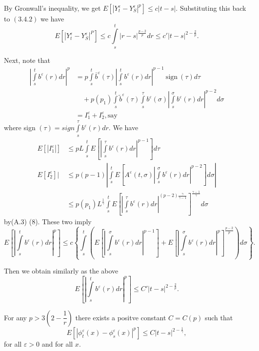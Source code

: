  By Gronwall's inequality, we get $E[| Y^\varepsilon_t-
   Y^\varepsilon_S |^p] \le c|t-s|$. Substituting this back to
 $(3.4.2)$ we have  
 \begin{equation*}
   E[| Y^\varepsilon_t - Y^\varepsilon_S |^P]  \le c \int\limits_{s}^t
   |r-s|^{\frac{p-2}{p}} dr 
   \le c'|t-s|^{2-\frac{2}{p}}. \tag{3.4.3}\label{c3:eq3.4.3} 
  \end{equation*}
   
Next, note that  
\begin{align*}
  |\int\limits_{s}^t b^\varepsilon (r) dr |^p &= p
  \int\limits_{s}^t \bar{b}^\varepsilon(\tau)| \int\limits_{s}^t
  b^\varepsilon (r) dr|^{p-1} ~\text{sign}~ (\tau) d \tau\\
  & \quad + p(p_1)
  \int\limits_{s}^t \tilde{b}^\varepsilon (\tau ) \int\limits_{s}^\tau
  b^\varepsilon (\sigma) | \int\limits_{s}^\sigma b^\varepsilon (r) dr
  |^{p-2} d \sigma\\ 
  &=I^\varepsilon_1 + I^\varepsilon_2,  \text{say}
\end{align*} 
 where sign $(\tau)= sign \int\limits_{s}^\tau b^\varepsilon (r) dr$. We have
 \begin{align*}
   E[|I^\varepsilon_1 |] &\le pL \int\limits_{s}^t E\left[|
     \int\limits_{s}^\tau b^\varepsilon (r) dr |^{p-1}\right] d \tau
   \tag*{(by(A.3)(7))}\\ 
   E[I^\varepsilon_2 ]| &\le p(p-1)| \int\limits_{s}^t
   E\left[A^\varepsilon(t, \sigma) |\int\limits_{s}^\sigma b^\varepsilon
     (r) dr |^{p-2}\right] d \sigma |\\ 
   &\le p(p_1)L^{\frac{1}{\gamma}} \int\limits_{s}^t E\left[|
     \int\limits_{s}^\tau b^\varepsilon (r) dr| ^{(p-2)
       \frac{\gamma}{\gamma-1}}\right]^{\frac{\gamma-1}{\gamma}} d \sigma 
 \end{align*} 
 by\pageoriginale (A.3) (8). These two imply
{\fontsize{10}{12}\selectfont 
$$
 E\left[| \int\limits_{s}^t b^\varepsilon (r) dr|^p\right] \le c
 \left\{\int\limits_{s}^t \left(E\left[| \int\limits_{s}^\sigma b^\varepsilon (r)
   dr|^{p-1}\right] +E \left[| \int\limits_{s}^\sigma b^\varepsilon  (r)
   dr|^p\right]^{\frac{p-2}{p}}\right) d \sigma \right\}. 
 $$}\relax
  
 Then we obtain similarly as the above
 $$
 E\left[| \int\limits_{s}^t b^\varepsilon (r)  dr |^p \right] \le
 C'|t-s|^{2- \frac{2}{p}}. 
 $$

\setcounter{Lemma}{1}
\begin{Lemma}\label{c3:lem3.4.2}%
  For any $p > 3(2- \dfrac{1}{r})$ there exists a positve constant
  $C=C(p)$ such that 
  \begin{equation*} 
    E[| \phi^\varepsilon_t (x) - \phi^\varepsilon_s(x) |^p ] \le
    C|t-s|^{2- \frac{1}{\gamma}}, \tag{3.4.4}\label{c3:eq3.4.4} 
  \end{equation*}
  for all $\varepsilon > 0$ and for all $x$.
\end{Lemma} 

